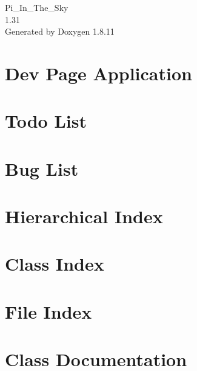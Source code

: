 \documentclass[twoside]{book}
\newcommand{\+}{\discretionary{\mbox{\scriptsize$\hookleftarrow$}}{}{}}
\newcommand{\clearemptydoublepage}{%
  \newpage{\pagestyle{empty}\cleardoublepage}%
}
\begin{document}
\hypersetup{pageanchor=false,
             bookmarksnumbered=true,
             pdfencoding=unicode
            }
\begin{titlepage}
\vspace*{7cm}
\begin{center}%
{\Large Pi\+\_\+\+In\+\_\+\+The\+\_\+\+Sky \\[1ex]\large 1.\+31 }\\
\vspace*{1cm}
{\large Generated by Doxygen 1.8.11}\\
\end{center}
\end{titlepage}
\clearemptydoublepage
\tableofcontents
\clearemptydoublepage
{}
\hypersetup{pageanchor=true}

\chapter{Dev Page Application}
\label{index}\hypertarget{index}{}
\chapter{Todo List}
\label{todo}
\hypertarget{todo}{}

\chapter{Bug List}
\label{bug}
\hypertarget{bug}{}

\chapter{Hierarchical Index}

\chapter{Class Index}

\chapter{File Index}

\chapter{Class Documentation}





























\end{document}
